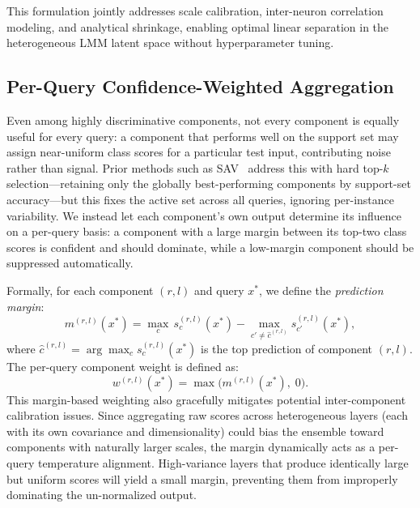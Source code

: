 \documentclass[sigconf,review,anonymous,9pt,table]{acmart}
\begin{document}
This formulation jointly addresses scale calibration, inter-neuron correlation modeling, and analytical shrinkage, enabling optimal linear separation in the heterogeneous LMM latent space without hyperparameter tuning.

\subsection{Per-Query Confidence-Weighted Aggregation}

Even among highly discriminative components, not every component is equally useful for every query: a component that performs well on the support set may assign near-uniform class scores for a particular test input, contributing noise rather than signal.
Prior methods such as SAV~\cite{mitra2025enhancing} address this with hard top-$k$ selection—retaining only the globally best-performing components by support-set accuracy—but this fixes the active set across all queries, ignoring per-instance variability.
We instead let each component's own output determine its influence on a per-query basis: a component with a large margin between its top-two class scores is confident and should dominate, while a low-margin component should be suppressed automatically.

Formally, for each component $(r, l)$ and query $x^*$, we define the \emph{prediction margin}:
\begin{equation}
  m^{(r,l)}(x^*) = \max_c \, s_c^{(r,l)}(x^*) - \max_{c' \neq \hat{c}^{(r,l)}} s_{c'}^{(r,l)}(x^*),
  \label{eq:margin}
\end{equation}
where $\hat{c}^{(r,l)} = \arg\max_c s_c^{(r,l)}(x^*)$ is the top prediction of component $(r, l)$.
The per-query component weight is defined as:
\begin{equation}
  w^{(r,l)}(x^*) = \max\!\bigl(m^{(r,l)}(x^*),\; 0\bigr).
  \label{eq:weight}
\end{equation}
This margin-based weighting also gracefully mitigates potential inter-component calibration issues. Since aggregating raw scores across heterogeneous layers (each with its own covariance and dimensionality) could bias the ensemble toward components with naturally larger scales, the margin dynamically acts as a per-query temperature alignment. High-variance layers that produce identically large but uniform scores will yield a small margin, preventing them from improperly dominating the un-normalized output.
\end{document}
